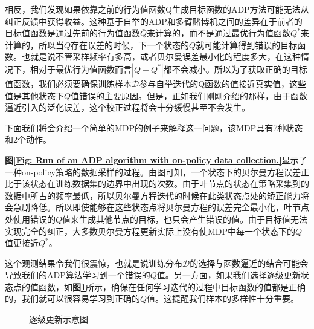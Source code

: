 相反，我们发现如果依靠之前的行为值函数Q生成目标函数的ADP方法可能无法从纠正反馈中获得收益。这种基于自举的ADP和多臂赌博机之间的差异在于前者的目标值函数是通过先前的行为值函数$\bar{Q}$来计算的，而不是通过最优行为值函数$Q^*$来计算的，所以当$\bar{Q}$存在误差的时候，下一个状态的$\bar{Q}$就可能计算得到错误的目标函数。也就是说不管采样频率有多高，或者贝尔曼误差最小化的程度多大，在这种情况下，相对于最优行为值函数而言$\left|Q-Q^{*}\right|$都不会减小。所以为了获取正确的目标值函数，我们必须要确保训练样本$\mathcal{D}$参与自举迭代的Q函数的值接近真实值，这些值是其他状态下$Q$值错误的主要原因。但是，正如我们刚刚介绍的那样，由于函数逼近引入的泛化误差，这个校正过程将会十分缓慢甚至不会发生。

下面我们将会介绍一个简单的MDP的例子来解释这一问题，该MDP具有7种状态和2个动作。


\textbf{图\ref{Fig: Run of an ADP algorithm with on-policy data collection.}}显示了一种on-policy策略的数据采样的过程。由图可知，一个状态下的贝尔曼方程误差正比于该状态在训练数据集的边界中出现的次数。由于叶节点的状态在策略采集到的数据中所占的频率最低，所以贝尔曼方程迭代的时候在此类状态点处的矫正能力将会急剧降低。所以即使能够在这些状态点将贝尔曼方程的误差完全最小化，叶节点处使用错误的$Q$值来生成其他节点的目标，也只会产生错误的值。由于目标值无法实现完全的纠正，大多数贝尔曼方程更新实际上没有使MDP中每一个状态下的$Q$值更接近$Q^*$。

这个观测结果令我们很震惊，也就是说训练分布$\mathcal{D}$的选择与函数逼近的结合可能会导致我们的ADP算法学习到一个错误的$Q$值。另一方面，如果我们选择逐级更新状态点的值函数，如\textbf{图\ref{Fig: Run of an ADP algorithm with an oracle distribution}}所示，确保在任何学习迭代的过程中目标函数的值都是正确的，我们就可以很容易学习到正确的$Q$值。这提醒我们样本的多样性十分重要。

\begin{figure}[!t]
	\centering
	\caption{逐级更新示意图}
	\label{Fig: Run of an ADP algorithm with an oracle distribution}
\end{figure}


